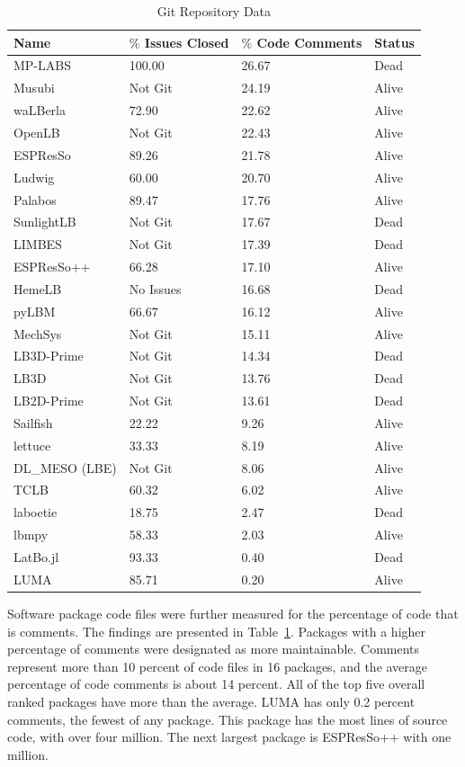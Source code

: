 \documentclass[final, 3p, times, authoryear]{elsarticle}
\begin{document}
\begin{table}
	\begin{center}
		\begin{tabular}{ p{3.5cm}p{3.5cm}p{3.5cm}p{2.5cm} }
			\toprule
			Name & $\%$ Issues Closed & $\%$ Code Comments & Status\\
			\midrule
			MP-LABS & 100.00 & 26.67 & Dead\\
			Musubi & Not Git & 24.19 & Alive\\
			waLBerla & 72.90 & 22.62 & Alive\\
			OpenLB & Not Git & 22.43 & Alive\\
			ESPResSo & 89.26 & 21.78 & Alive\\
			Ludwig& 60.00 & 20.70 & Alive\\
			Palabos & 89.47 & 17.76 & Alive\\
			SunlightLB & Not Git & 17.67 & Dead\\
			LIMBES & Not Git & 17.39 & Dead\\
			ESPResSo++ & 66.28 & 17.10 & Alive\\
			HemeLB & No Issues & 16.68 & Dead\\
			pyLBM & 66.67& 16.12 & Alive\\
			MechSys & Not Git & 15.11 & Alive\\
			LB3D-Prime & Not Git & 14.34 & Dead\\
			LB3D & Not Git & 13.76 & Dead\\
			LB2D-Prime & Not Git & 13.61 & Dead\\
			Sailfish & 22.22 & 9.26 & Alive\\
			lettuce & 33.33 & 8.19 & Alive\\
			DL\_MESO (LBE) & Not Git & 8.06& Alive\\
			TCLB & 60.32 & 6.02 & Alive\\
			laboetie & 18.75 & 2.47 & Dead\\	
			lbmpy& 58.33  & 2.03 & Alive\\	
			LatBo.jl & 93.33 & 0.40 & Dead\\
			LUMA& 85.71   & 0.20 & Alive\\
			\bottomrule
		\end{tabular}
		\caption{Git Repository Data} \label{gitrepodata}
	\end{center}
	\end{table}
		
Software package code files were further measured for the percentage of code
that is comments. The findings are presented in Table~\ref{gitrepodata}.
Packages with a higher percentage of comments were designated as more
maintainable. Comments represent more than 10 percent of code files in 16
packages, and the average percentage of code comments is about 14 percent. All
of the top five overall ranked packages have more than the average. LUMA has only 0.2 percent comments, the fewest of any package. This package has the most lines of source code, with over four million. The next largest package is ESPResSo++ with one million.
\end{document}
